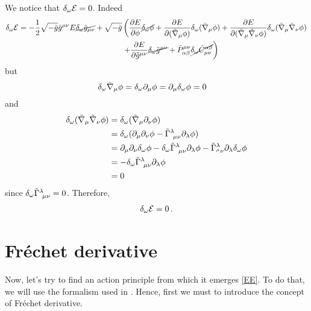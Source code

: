 We notice that $\delta_\omega\mathcal{E}=0$. Indeed
\begin{align*}
  \delta_\omega\mathcal{E}=-\frac{1}{2}\sqrt{-\tilde{g}}\tilde{g}^{\mu\nu }E\cancel{\delta_\omega\tilde{g}_{\mu\nu }}+\sqrt{-\tilde{g}}&\left(\pdv{E}{\phi}\cancel{\delta_\omega\phi} +\pdv{E}{(\tilde{\nabla}_\mu\phi)}\delta_\omega (\tilde{\nabla}_\mu\phi )+\pdv{E}{(\tilde{\nabla}_\mu\tilde{\nabla}_\nu\phi)}\delta_\omega(\tilde{\nabla}_\mu\tilde{\nabla}_\nu\phi )\right.\\&\left. +\pdv{E}{\tilde{g}^{\mu\nu}}\cancel{\delta_\omega\tilde{g}^{\mu\nu }}+\tilde{P}^{\mu\nu }_{\alpha\beta}\cancel{\delta_\omega\tilde{C}^{\alpha\beta }_{\mu\nu }}\right)
\end{align*}
but
\begin{align}
  \delta_\omega\tilde{\nabla}_\mu\phi&=\delta_\omega\partial_\mu\phi =\partial_\mu\delta_\omega\phi=0
\end{align}
and
\begin{align}
  \delta_\omega(\tilde{\nabla}_\mu\tilde{\nabla}_\nu\phi )&=\delta_\omega(\tilde{\nabla}_\mu\partial_\nu \phi )\\
 &=\delta_\omega(\partial_\mu\partial_\nu \phi -\tilde{\Gamma}^{\lambda}_{~\mu\nu }\partial_\lambda\phi )\\
 &=\partial_\mu\partial_\nu \delta_\omega\phi -\delta_\omega\tilde{\Gamma}^\lambda_{~\mu\nu }\partial_\lambda\phi -\tilde{\Gamma}^\lambda_{^\mu\nu }\partial_\lambda \delta_\omega\phi \\
 &=-\delta_\omega\tilde{\Gamma}^\lambda_{~\mu\nu }\partial_\lambda\phi\\
 &=0
\end{align}
since $\delta_\omega\tilde{\Gamma}^\lambda_{~\mu\nu }=0$. Therefore,
\begin{align}
  \delta_\omega\mathcal{E}=0\, .
\end{align}




\section{Fréchet derivative}
Now, let's try to find an action principle from which it emerges \eqref{EE}. To do that, we will use the formalism used in \cite{Ayon-Beato:2023bzp}. Hence, first we must to introduce the concept of Fréchet derivative.

